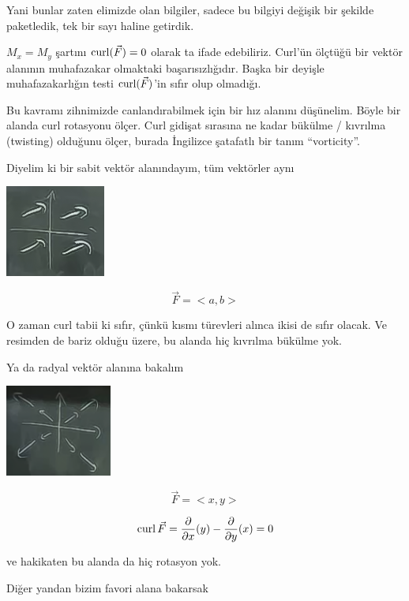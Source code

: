 \documentclass[12pt,fleqn]{article}\usepackage{../../common}
\begin{document}
Yani bunlar zaten elimizde olan bilgiler, sadece bu bilgiyi değişik bir şekilde
paketledik, tek bir sayı haline getirdik.

$M_x = M_y$ şartını $\operatorname{curl}(\vec{F}) = 0$ olarak ta ifade edebiliriz. Curl'ün
ölçtüğü bir vektör alanının muhafazakar olmaktaki başarısızlığıdır. Başka bir
deyişle muhafazakarlığın testi $\operatorname{curl}(\vec{F})$'in sıfır olup olmadığı.


Bu kavramı zihnimizde canlandırabilmek için bir hız alanını düşünelim. Böyle bir
alanda curl rotasyonu ölçer. Curl gidişat sırasına ne kadar bükülme / kıvrılma
(twisting) olduğunu ölçer, burada İngilizce şatafatlı bir tanım ``vorticity''.


Diyelim ki bir sabit vektör alanındayım, tüm vektörler aynı

\begin{center}

\includegraphics[height=3cm]{21_5.png}

\end{center}
$$ \vec{F} = <a,b> $$

O zaman curl tabii ki sıfır, çünkü kısmı türevleri alınca ikisi de sıfır
olacak. Ve resimden de bariz olduğu üzere, bu alanda hiç kıvrılma bükülme yok.

Ya da radyal vektör alanına bakalım

\begin{center}

\includegraphics[height=3cm]{21_6.png}

\end{center}
$$ \vec{F}= <x,y> $$

$$
\operatorname{curl} \vec{F} =
\frac{\partial }{\partial x}(y) -
\frac{\partial }{\partial y}(x) = 0
$$

ve hakikaten bu alanda da hiç rotasyon yok. 

Diğer yandan bizim favori alana bakarsak
\end{document}
